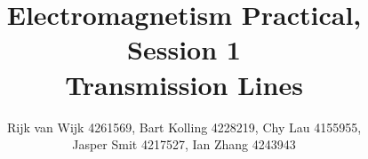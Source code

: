 \documentclass{article}
\title{Electromagnetism Practical, Session 1\\Transmission Lines}
\author{Rijk van Wijk 4261569, Bart Kolling 4228219, Chy Lau 4155955,\\ Jasper Smit 4217527, Ian Zhang 4243943}
\begin{document}
	\maketitle
	
	\clearpage
	\tableofcontents
	

	

	\clearpage
	
	
	\begin{appendices}
	
	\end{appendices}
\end{document}
